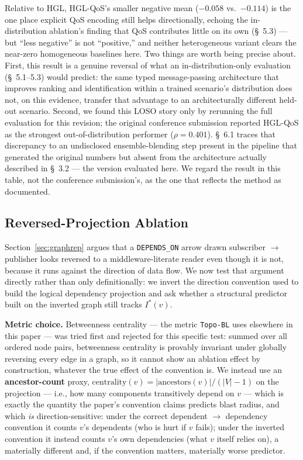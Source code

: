 \documentclass[review]{elsarticle}
\begin{document}
Relative to HGL, HGL-QoS's smaller negative mean ($-0.058$ vs.\ $-0.114$) is the one place explicit
QoS encoding still helps directionally, echoing the in-distribution ablation's finding that QoS
contributes little on its own (\S~5.3) --- but ``less negative'' is not ``positive,'' and neither
heterogeneous variant clears the near-zero homogeneous baselines here. Two things are worth being
precise about. First, this result is a genuine reversal of what an in-distribution-only evaluation
(\S~5.1--5.3) would predict: the same typed message-passing architecture that improves ranking and
identification within a trained scenario's distribution does not, on this evidence, transfer that
advantage to an architecturally different held-out scenario. Second, we found this LOSO story only
by rerunning the full evaluation for this revision; the original conference submission reported
HGL-QoS as the strongest out-of-distribution performer ($\rho=0.401$). \S~6.1 traces that
discrepancy to an undisclosed ensemble-blending step present in the pipeline that generated the
original numbers but absent from the architecture actually described in \S~3.2 --- the version
evaluated here. We regard the result in this table, not the conference submission's, as the one
that reflects the method as documented.

\subsection{Reversed-Projection Ablation}
\label{sec:reversed}

Section~\ref{sec:graphrep} argues that a \texttt{DEPENDS\_ON} arrow drawn subscriber $\to$
publisher looks reversed to a middleware-literate reader even though it is not, because it runs
against the direction of data flow. We now test that argument directly rather than only
definitionally: we invert the direction convention used to build the logical dependency projection
and ask whether a structural predictor built on the inverted graph still tracks $I^*(v)$.

\textbf{Metric choice.} Betweenness centrality --- the metric \texttt{Topo-BL} uses elsewhere in
this paper --- was tried first and rejected for this specific test: summed over all ordered node
pairs, betweenness centrality is provably invariant under globally reversing every edge in a graph,
so it cannot show an ablation effect by construction, whatever the true effect of the convention
is. We instead use an \textbf{ancestor-count} proxy, $\text{centrality}(v) = |\text{ancestors}(v)|
/ (|V|-1)$ on the projection --- i.e., how many components transitively depend on $v$ --- which is
exactly the quantity the paper's convention claims predicts blast radius, and which \emph{is}
direction-sensitive: under the correct dependent $\to$ dependency convention it counts $v$'s
dependents (who is hurt if $v$ fails); under the inverted convention it instead counts $v$'s own
dependencies (what $v$ itself relies on), a materially different and, if the convention matters,
materially worse predictor.
\end{document}
